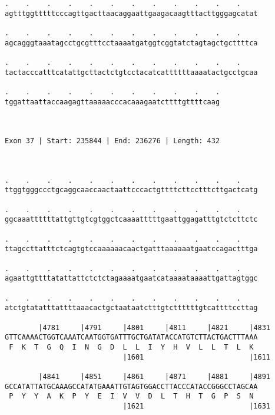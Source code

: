 \documentclass{article}
\begin{document}
\begin{Verbatim}
.    .    .    .    .    .    .    .    .    .    .    .    
agtttggtttttcccagttgacttaacaggaattgaagacaagtttacttgggagcatat
                                                            
.    .    .    .    .    .    .    .    .    .    .    .    
agcagggtaaatagcctgcgtttcctaaaatgatggtcggtatctagtagctgcttttca
                                                            
.    .    .    .    .    .    .    .    .    .    .    .    
tactacccatttcatattgcttactctgtcctacatcattttttaaaatactgcctgcaa
                                                            
.    .    .    .    .    .    .    .    .    .    .
tggattaattaccaagagttaaaaacccacaaagaatcttttgttttcaag
                                                   
                                                   
 
Exon 37 | Start: 235844 | End: 236276 | Length: 432



.    .    .    .    .    .    .    .    .    .    .    .    
ttggtgggccctgcaggcaaccaactaattcccactgttttcttcctttcttgactcatg
                                                            
.    .    .    .    .    .    .    .    .    .    .    .    
ggcaaattttttattgttgtcgtggctcaaaatttttgaattggagatttgtctcttctc
                                                            
.    .    .    .    .    .    .    .    .    .    .    .    
ttagccttatttctcagtgtccaaaaaacaactgatttaaaaaatgaatccagactttga
                                                            
.    .    .    .    .    .    .    .    .    .    .    .    
agaattgttttatattattctctctagaaaatgaatcataaaataaaattgattagtggc
                                                            
.    .    .    .    .    .    .    .    .    .    .    .    
atctgtatatttattttaaacactgctaataatctttgtcttttttgtcattttccttag
                                                            
        |4781     |4791     |4801     |4811     |4821     |4831
GTTCAAAACTGGTCAAATCAATGGTGATTTGCTGATATACCATGTCTTACTGACTTTAAA
 F  K  T  G  Q  I  N  G  D  L  L  I  Y  H  V  L  L  T  L  K 
                            |1601                         |1611
  
        |4841     |4851     |4861     |4871     |4881     |4891
GCCATATTATGCAAAGCCATATGAAATTGTAGTGGACCTTACCCATACCGGGCCTAGCAA
 P  Y  Y  A  K  P  Y  E  I  V  V  D  L  T  H  T  G  P  S  N 
                            |1621                         |1631
  

\end{Verbatim}
\end{document}
